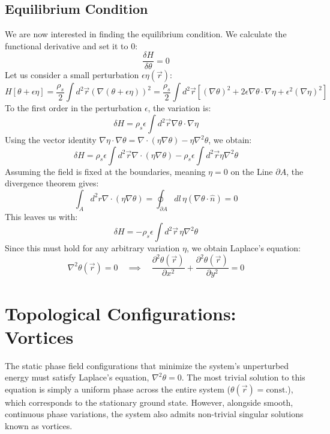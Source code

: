 \documentclass[english,binding=0.6cm,noexaminfo]{sapthesis}
\newcommand{\rhos}{\rho_s}
\begin{document}
\subsection{Equilibrium Condition}
We are now interested in finding the equilibrium condition. We calculate the functional derivative and set it to $0$:
\begin{equation}
    \frac{\delta H}{\delta\theta} = 0
\end{equation}
Let us consider a small perturbation $\epsilon\eta(\vec{r})$:
\begin{equation}
    H[\theta + \epsilon\eta] = \frac{\rhos}{2} \int d^2\vec{r} (\nabla(\theta + \epsilon\eta))^2 = \frac{\rhos}{2} \int d^2\vec{r} \left[ (\nabla\theta)^2 + 2\epsilon\nabla\theta \cdot \nabla\eta + \epsilon^2(\nabla\eta)^2 \right]
\end{equation}
To the first order in the perturbation $\epsilon$, the variation is:
\begin{equation}
    \delta H = \rhos \epsilon\int d^2\vec{r} \nabla\theta \cdot \nabla\eta
\end{equation}
Using the vector identity $\nabla\eta \cdot \nabla\theta=\nabla \cdot (\eta\nabla\theta)-\eta\nabla^2\theta$, we obtain:
\begin{equation}
    \delta H = \rhos\epsilon \int d^2\vec{r} \nabla \cdot (\eta\nabla\theta) - \rhos\epsilon \int d^2\vec{r} \eta\nabla^2\theta
\end{equation}
Assuming the field is fixed at the boundaries, meaning $\eta = 0$ on the Line $\partial A$, the divergence theorem gives:
\begin{equation}
    \int_A d^2r \nabla \cdot (\eta\nabla\theta) = \oint_{\partial A} dl \, \eta (\nabla\theta \cdot \hat{n}) = 0
\end{equation}
This leaves us with:
\begin{equation}
    \delta H = -\rhos\epsilon \int d^2\vec{r} \, \eta \nabla^2\theta
\end{equation}
Since this must hold for any arbitrary variation $\eta$, we obtain Laplace's equation:
\begin{equation}
    \nabla^2\theta(\vec{r}) = 0 \quad \implies \quad \frac{\partial^2\theta(\vec{r})}{\partial x^2} + \frac{\partial^2\theta(\vec{r})}{\partial y^2} = 0
\end{equation}
\section{Topological Configurations: Vortices}
The static phase field configurations that minimize the system's unperturbed energy must satisfy Laplace's equation, $\nabla^2 \theta = 0$. The most trivial solution to this equation is simply a uniform phase across the entire system ($\theta(\vec{r}) = \text{const.}$), which corresponds to the stationary ground state. However, alongside smooth, continuous phase variations, the system also admits non-trivial singular solutions known as vortices.
\end{document}
